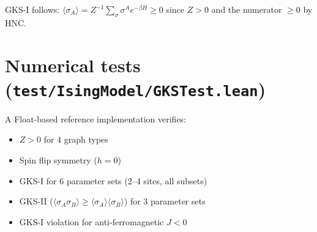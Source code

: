 \documentclass[a4paper,11pt]{article}
\begin{document}
\noindent
GKS-I follows: $\langle \sigma_A \rangle
= Z^{-1}\sum_\sigma \sigma^A e^{-\beta H} \geq 0$
since $Z > 0$ and the numerator $\geq 0$ by HNC.

\section{Numerical tests (\texttt{test/IsingModel/GKSTest.lean})}

A Float-based reference implementation verifies:
\begin{itemize}
  \item $Z > 0$ for 4 graph types
  \item Spin flip symmetry ($h = 0$)
  \item GKS-I for 6 parameter sets (2--4 sites, all subsets)
  \item GKS-II ($\langle\sigma_A\sigma_B\rangle \geq
    \langle\sigma_A\rangle\langle\sigma_B\rangle$)
    for 3 parameter sets
  \item GKS-I violation for anti-ferromagnetic $J < 0$
\end{itemize}
\end{document}

